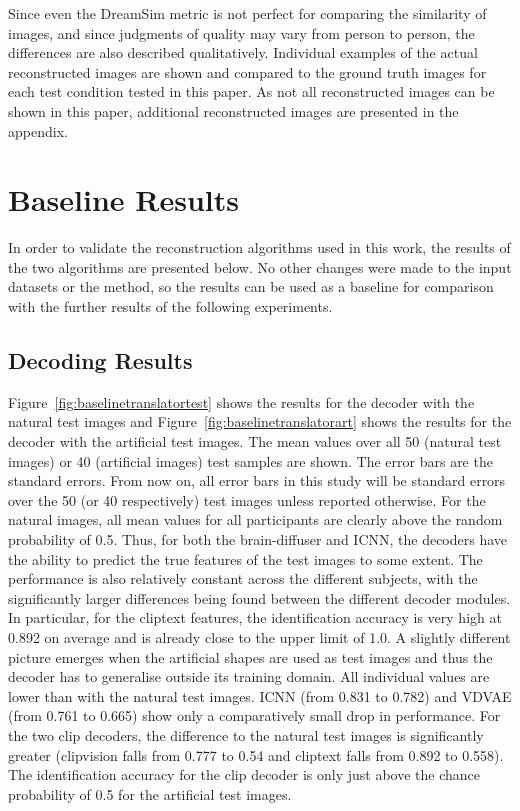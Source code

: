 Since even the DreamSim metric is not perfect for comparing the similarity of images, and since judgments of quality may vary from person to person, the differences are also described qualitatively. Individual examples of the actual reconstructed images are shown and compared to the ground truth images for each test condition tested in this paper.  As not all reconstructed images can be shown in this paper, additional reconstructed images are presented in the appendix.

\section{Baseline Results}
In order to validate the reconstruction algorithms used in this work, the results of the two algorithms are presented below. No other changes were made to the input datasets or the method, so the results can be used as a baseline for comparison with the further results of the following experiments.

\subsection{Decoding Results}

Figure~\ref{fig:baselinetranslatortest} shows the results for the decoder with the natural test images and Figure~\ref{fig:baselinetranslatorart} shows the results for the decoder with the artificial test images. The mean values over all 50 (natural test images) or 40 (artificial images) test samples are shown. The error bars are the standard errors. From now on, all error bars in this study will be standard errors over the 50 (or 40 respectively) test images unless reported otherwise.
For the natural images, all mean values for all participants are clearly above the random probability of 0.5. Thus, for both the brain-diffuser and ICNN, the decoders have the ability to predict the true features of the test images to some extent. The performance is also relatively constant across the different subjects, with the significantly larger differences being found between the different decoder modules. In particular, for the cliptext features, the identification accuracy is very high at 0.892 on average and is already close to the upper limit of 1.0. A slightly different picture emerges when the artificial shapes are used as test images and thus the decoder has to generalise outside its training domain. All individual values are lower than with the natural test images. ICNN (from 0.831 to 0.782) and VDVAE (from 0.761 to 0.665) show only a comparatively small drop in performance. For the two clip decoders, the difference to the natural test images is significantly greater (clipvision falls from 0.777 to 0.54 and cliptext falls from 0.892 to 0.558). The identification accuracy for the clip decoder is only just above the chance probability of 0.5 for the artificial test images.

